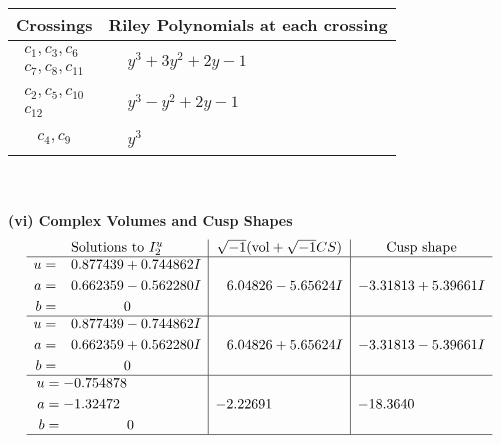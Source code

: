 \documentclass[1p]{elsarticle_modified}
\theoremstyle{definition}
\newcommand{\I}{\sqrt{-1}}
\begin{document}
\begin{tabular}{m{50pt}|m{274pt}}
Crossings & \hspace{64pt}Riley Polynomials at each crossing \\
\hline $$\begin{aligned}c_{1},c_{3},c_{6}\\c_{7},c_{8},c_{11}\end{aligned}$$&$\begin{aligned}
&y^3+3 y^2+2 y-1
\end{aligned}$\\
\hline $$\begin{aligned}c_{2},c_{5},c_{10}\\c_{12}\end{aligned}$$&$\begin{aligned}
&y^3- y^2+2 y-1
\end{aligned}$\\
\hline $$\begin{aligned}c_{4},c_{9}\end{aligned}$$&$\begin{aligned}
&y^3
\end{aligned}$\\
\hline
\end{tabular}\\~\\
\newpage\flushleft \textbf{(vi) Complex Volumes and Cusp Shapes}
$$\begin{array}{c|c|c}  
\text{Solutions to }I^u_{2}& \I (\text{vol} + \sqrt{-1}CS) & \text{Cusp shape}\\
 \hline 
\begin{aligned}
u &= \phantom{-}0.877439 + 0.744862 I \\
a &= \phantom{-}0.662359 - 0.562280 I \\
b &= \phantom{-0.000000 } 0\end{aligned}
 & \phantom{-}6.04826 - 5.65624 I & -3.31813 + 5.39661 I \\ \hline\begin{aligned}
u &= \phantom{-}0.877439 - 0.744862 I \\
a &= \phantom{-}0.662359 + 0.562280 I \\
b &= \phantom{-0.000000 } 0\end{aligned}
 & \phantom{-}6.04826 + 5.65624 I & -3.31813 - 5.39661 I \\ \hline\begin{aligned}
u &= -0.754878\phantom{ +0.000000I} \\
a &= -1.32472\phantom{ +0.000000I} \\
b &= \phantom{-0.000000 } 0\end{aligned}
 & -2.22691\phantom{ +0.000000I} & -18.3640\phantom{ +0.000000I}\\
 \hline 
 \end{array}$$\newpage\newpage\renewcommand{\arraystretch}{1}
\end{document}
